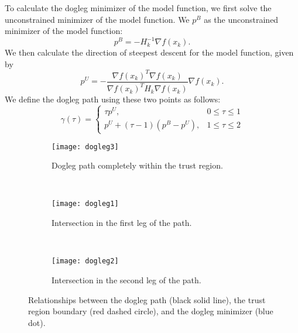 To calculate the dogleg minimizer of the model function, we first solve the unconstrained minimizer of the model function.  We $p^B$ as the unconstrained minimizer of the model function:
\[
p^B = -H_k^{-1}\nabla f(x_k).
\]
We then calculate the direction of steepest descent for the model function, given by
\[
p^U = -\frac{\nabla f(x_k)^T\nabla f(x_k)}{\nabla f(x_k)^TH_k\nabla f(x_k)}\nabla f(x_k).
\]
We define the dogleg path using these two points as follows:
\[
\gamma(\tau) =  \left\{
     \begin{array}{lr}
       \tau p^U, & 0\leq \tau \leq 1\\
       p^U+(\tau-1)(p^B-p^U), & 1\leq \tau\leq 2
     \end{array}
   \right.
\]

\begin{figure}
\centering
    \begin{subfigure}[b]{0.3\textwidth}
            \texttt{[image: dogleg3]}
            \caption{Dogleg path completely within the trust region.}
            \label{fig:dl3}
    \end{subfigure}%
    ~ %
    \begin{subfigure}[b]{0.3\textwidth}
            \texttt{[image: dogleg1]}
            \caption{Intersection in the first leg of the path.}
            \label{fig:dl1}
    \end{subfigure}
    ~ %
    \begin{subfigure}[b]{0.3\textwidth}
            \texttt{[image: dogleg2]}
            \caption{Intersection in the second leg of the path.}
            \label{fig:dl2}
    \end{subfigure}
    \caption{Relationships between the dogleg path (black solid line),
    the trust region boundary (red dashed circle), and the dogleg minimizer (blue dot).}
    \label{fig:dogleg}
\end{figure}

